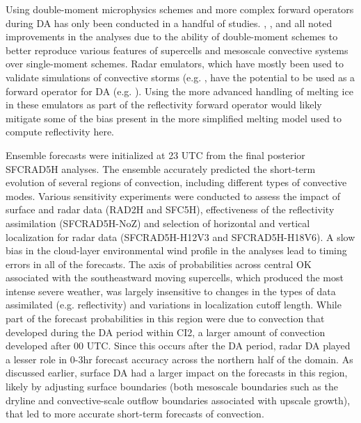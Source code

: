 Using double-moment microphysics schemes and more complex forward operators during DA has only been conducted in a handful of studies. \citet{jungetal12}, \citet{putnametal13}, and \citet{yussoufetal13} all noted improvements in the analyses due to the ability of double-moment schemes to better reproduce various features of supercells and mesoscale convective systems over single-moment schemes. Radar emulators, which have mostly been used to validate simulations of convective storms (e.g. \citet{jungetal10,dawsonetal13}, have the potential to be used as a forward operator for DA (e.g. \citet{jungetal12}). Using the more advanced handling of melting ice in these emulators as part of the reflectivity forward operator would likely mitigate some of the bias present in the more simplified melting model used to compute reflectivity here.

Ensemble forecasts were initialized at 23 UTC from the final posterior SFCRAD5H analyses. The ensemble accurately predicted the short-term evolution of several regions of convection, including different types of convective modes. Various sensitivity experiments were conducted to assess the impact of surface and radar data (RAD2H and SFC5H), effectiveness of the reflectivity assimilation (SFCRAD5H-NoZ) and selection of horizontal and vertical localization for radar data (SFCRAD5H-H12V3 and SFCRAD5H-H18V6). A slow bias in the cloud-layer environmental wind profile in the analyses lead to timing errors in all of the forecasts. The axis of probabilities across central OK associated with the southeastward moving supercells, which produced the most intense severe weather, was largely insensitive to changes in the types of data assimilated (e.g. reflectivity) and variations in localization cutoff length. While part of the forecast probabilities in this region were due to convection that developed during the DA period within CI2, a larger amount of convection developed after 00 UTC. Since this occurs after the DA period, radar DA played a lesser role in 0-3hr forecast accuracy across the northern half of the domain. As discussed earlier, surface DA had a larger impact on the forecasts in this region, likely by adjusting surface boundaries (both mesoscale boundaries such as the dryline and convective-scale outflow boundaries associated with upscale growth), that led to more accurate short-term forecasts of convection.

